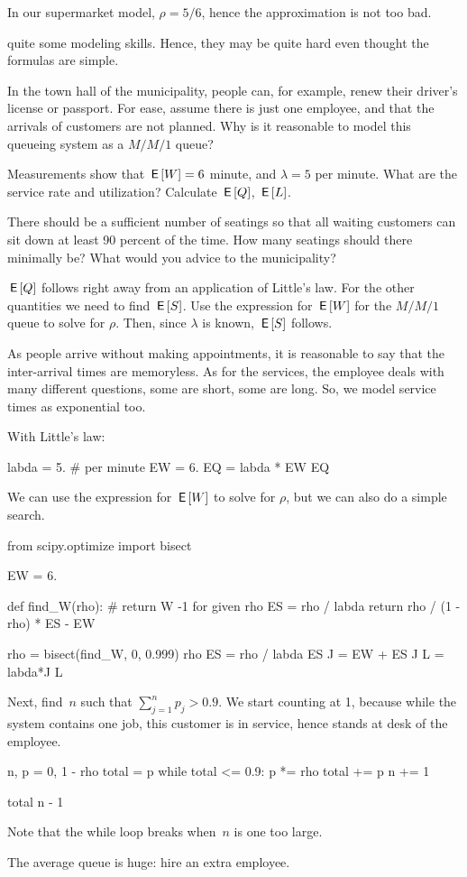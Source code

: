 \documentclass[queueing-book.tex]{subfiles}
\begin{document}
In our supermarket model, $\rho=5/6$, hence the approximation is not too bad.


 quite some modeling skills. Hence, they may be quite hard even thought the formulas are simple.

\begin{exercise}
In the town hall of the municipality, people can, for example, renew their driver's license or passport.
For ease, assume there is just one employee, and that the arrivals of customers are not planned.
Why is it reasonable to model this queueing system as a $M/M/1$ queue?

Measurements show that $\,\mathsf{E}\left[W\right] = 6$ minute, and $\lambda=5$ per minute.
What are the service rate and utilization?
Calculate $\,\mathsf{E}\left[Q\right]$, $\,\mathsf{E}\left[L\right]$.

There should be a sufficient number of seatings so that all waiting customers can sit down at least 90 percent of the time.
How many seatings should there minimally be? What would you advice to the municipality?
\begin{hint}
  $\,\mathsf{E}\left[Q\right]$ follows right away from an application of Little's law.
  For the other quantities we need to find $\,\mathsf{E}\left[S\right]$.
  Use the expression for  $\,\mathsf{E}\left[W\right]$ for the $M/M/1$ queue to solve for $\rho$. Then, since $\lambda$ is known, $\,\mathsf{E}\left[S\right]$ follows.
\end{hint}
\begin{solution}
As people arrive without making appointments, it is reasonable to say that the inter-arrival times are memoryless.
As for the services, the employee deals with many different questions, some are short, some are long.
So, we model service times as exponential too.

With Little's law:
\begin{pyconsole}[municipality]
labda = 5. # per minute
EW = 6.
EQ = labda * EW
EQ
\end{pyconsole}

We can use the expression for $\,\mathsf{E}\left[W\right]$ to solve for $\rho$, but we can also do a simple search.
\begin{pyconsole}[municipality]
from scipy.optimize import bisect

EW = 6.

def find_W(rho):
    # return W -1 for given rho
    ES = rho / labda
    return rho / (1 - rho) * ES - EW


rho = bisect(find_W, 0, 0.999)
rho
ES = rho / labda
ES
J = EW + ES
J
L = labda*J
L
\end{pyconsole}
Next, find~$n$ such that $\sum_{j=1}^n p_j > 0.9$.
We start counting at 1, because while the system contains one job, this customer is in service, hence stands at desk of the employee.
\begin{pyconsole}[municipality]
n, p = 0, 1 - rho
total = p
while total <= 0.9:
    p *= rho
    total += p
    n += 1

total
n - 1
\end{pyconsole}
Note that the while loop breaks when~$n$ is one too large.

The average queue is huge: hire an extra employee.
\end{solution}
\end{exercise}
\end{document}
